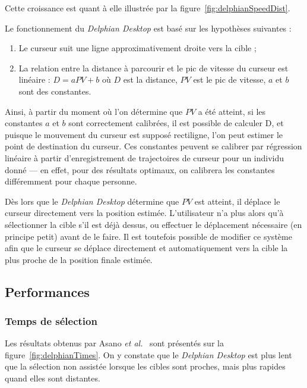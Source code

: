 	Cette croissance est quant à elle illustrée par la figure~\ref{fig:delphianSpeedDist}.
	
	Le fonctionnement du \emph{Delphian Desktop} est basé sur les hypothèses suivantes :
	
	\begin{enumerate}
		\item Le curseur suit une ligne approximativement droite vers la cible ;
		\item La relation entre la distance à parcourir et le pic de vitesse du curseur est linéaire : $D = aPV + b$ où $D$ est la distance, $PV$ est le pic de vitesse, $a$ et $b$ sont des constantes.
	\end{enumerate}
	
	Ainsi, à partir du moment où l'on détermine que $PV$ a été atteint, si les constantes $a$ et $b$ sont correctement calibrées, il est possible de calculer D, et puisque le mouvement du curseur est supposé rectiligne, l'on peut estimer le point de destination du curseur. Ces constantes peuvent se calibrer par régression linéaire à partir d'enregistrement de trajectoires de curseur pour un individu donné --- en effet, pour des résultats optimaux, on calibrera les constantes différemment pour chaque personne.
	
	Dès lors que le \emph{Delphian Desktop} détermine que $PV$ est atteint, il déplace le curseur directement vers la position estimée. L'utilisateur n'a plus alors qu'à sélectionner la cible s'il est déjà dessus, ou effectuer le déplacement nécessaire (en principe petit) avant de le faire. Il est toutefois possible de modifier ce système afin que le curseur se déplace directement et automatiquement vers la cible la plus proche de la position finale estimée.
	
	\subsection{Performances}
	\subsubsection{Temps de sélection}
	Les résultats obtenus par Asano \emph{et al.}~\cite{asano2005predictive} sont présentés sur la figure~\ref{fig:delphianTimes}. On y constate que le \emph{Delphian Desktop} est plus lent que la sélection non assistée lorsque les cibles sont proches, mais plus rapides quand elles sont distantes.
	
